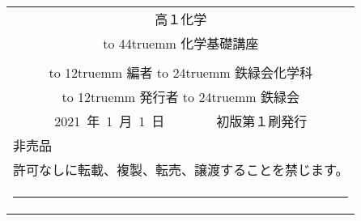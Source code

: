 \documentclass[book, twoside, paper=b5j, fleqn, jafontsize=9pt, jafontscale=1, head_space=22mm, foot_space=9mm, fore-edge=16mm, gutter=25mm, hanging_punctuation]{jlreq}
\newcommand{\kintou}[2]{%
\leavevmode
\hbox to #1{%
\ltjsetparameter{kanjiskip=0pt plus 1fill minus 1fill}%
\ltjsetparameter{xkanjiskip=\ltjgetparameter{kanjiskip}}%
#2}}
\begin{document}
\newpage
\pagestyle{empty}
\vfill
\begin{center}
    \setlength{\tabcolsep}{5truemm}
    \renewcommand{\extrarowheight}{2truemm}
    \begin{tabular}[H]{c} \toprule
        高１化学\\
        {\fontsize{14truept}{14truept}\selectfont\kintou{44truemm}{化学基礎講座}}\\
        \rule[0truemm]{0truemm}{8truemm}\\
        \kintou{12truemm}{編者}\hspace{8truemm} \kintou{24truemm}{鉄緑会化学科}\\
        \kintou{12truemm}{発行者}\hspace{8truemm} \kintou{24truemm}{鉄緑会}\\
        2021~年~1~月~1~日　　　　初版第１刷発行\\\bottomrule
        \multicolumn{1}{l}{非売品}\\
        \multicolumn{1}{l}{許可なしに転載、複製、転売、譲渡することを禁じます。}\\
        \rule[0truemm]{84.5truemm}{0truemm}\\
    \end{tabular}
\end{center}
\vspace{10truemm}%
\newpage
\end{document}

